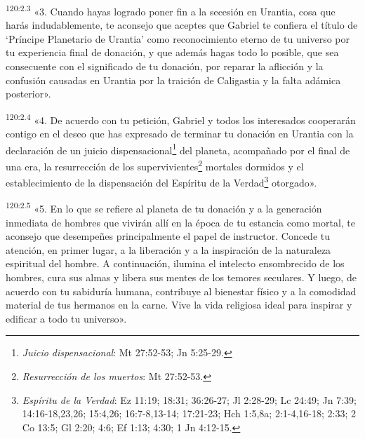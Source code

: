 \par 
\textsuperscript{120:2.3} «3. Cuando hayas logrado poner fin a la secesión en Urantia, cosa que harás indudablemente, te aconsejo que aceptes que Gabriel te confiera el título de `Príncipe Planetario de Urantia' como reconocimiento eterno de tu universo por tu experiencia final de donación, y que además hagas todo lo posible, que sea consecuente con el significado de tu donación, por reparar la aflicción y la confusión causadas en Urantia por la traición de Caligastia y la falta adámica posterior».

\par 
\textsuperscript{120:2.4} «4. De acuerdo con tu petición, Gabriel y todos los interesados cooperarán contigo en el deseo que has expresado de terminar tu donación en Urantia con la declaración de un juicio dispensacional\footnote{\textit{Juicio dispensacional}: Mt 27:52-53; Jn 5:25-29.} del planeta, acompañado por el final de una era, la resurrección de los supervivientes\footnote{\textit{Resurrección de los muertos}: Mt 27:52-53.} mortales dormidos y el establecimiento de la dispensación del Espíritu de la Verdad\footnote{\textit{Espíritu de la Verdad}: Ez 11:19; 18:31; 36:26-27; Jl 2:28-29; Lc 24:49; Jn 7:39; 14:16-18,23,26; 15:4,26; 16:7-8,13-14; 17:21-23; Hch 1:5,8a; 2:1-4,16-18; 2:33; 2 Co 13:5; Gl 2:20; 4:6; Ef 1:13; 4:30; 1 Jn 4:12-15.} otorgado».

\par 
\textsuperscript{120:2.5} «5. En lo que se refiere al planeta de tu donación y a la generación inmediata de hombres que vivirán allí en la época de tu estancia como mortal, te aconsejo que desempeñes principalmente el papel de instructor. Concede tu atención, en primer lugar, a la liberación y a la inspiración de la naturaleza espiritual del hombre. A continuación, ilumina el intelecto ensombrecido de los hombres, cura sus almas y libera sus mentes de los temores seculares. Y luego, de acuerdo con tu sabiduría humana, contribuye al bienestar físico y a la comodidad material de tus hermanos en la carne. Vive la vida religiosa ideal para inspirar y edificar a todo tu universo».

